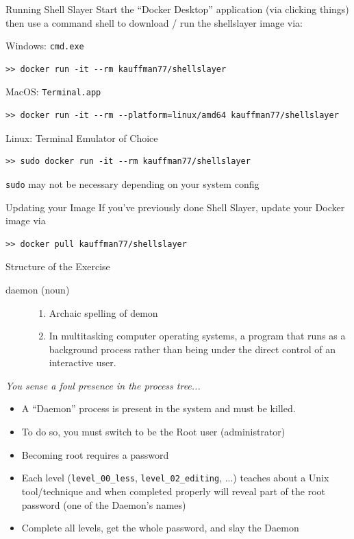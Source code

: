 \documentclass[mathserif]{beamer}
\begin{document}
\begin{frame}[label={sec:org00be9dd},fragile]{Running Shell Slayer}
 Start the ``Docker Desktop'' application (via clicking things) then use
a command shell to download / run the shellslayer image via:

\footnotesize
\begin{block}{Windows: \texttt{cmd.exe}}
\begin{verbatim}
>> docker run -it --rm kauffman77/shellslayer
\end{verbatim}
\end{block}
\begin{block}{MacOS: \texttt{Terminal.app}}
\begin{verbatim}
>> docker run -it --rm --platform=linux/amd64 kauffman77/shellslayer
\end{verbatim}
\end{block}
\begin{block}{Linux: Terminal Emulator of Choice}
\begin{verbatim}
>> sudo docker run -it --rm kauffman77/shellslayer
\end{verbatim}
\texttt{sudo} may not be necessary depending on your system config
\end{block}
\begin{block}{Updating your Image}
If you've previously done Shell Slayer, update your Docker image via
\begin{verbatim}
>> docker pull kauffman77/shellslayer
\end{verbatim}
\end{block}
\end{frame}
\begin{frame}[label={sec:orgffa0f62},fragile]{Structure of the Exercise}
 \begin{description}
\item[{daemon (noun)}] \begin{enumerate}
\item Archaic spelling of demon
\item In multitasking computer operating systems, a program that runs
as a background process rather than being under the direct
control of an interactive user.
\end{enumerate}
\end{description}

\normalsize
\emph{You sense a foul presence in the process tree...}
\begin{itemize}
\item A ``Daemon'' process is present in the system and must be killed.
\item To do so, you must switch to be the Root user (administrator)
\item Becoming root requires a password
\item Each level (\texttt{level\_00\_less}, \texttt{level\_02\_editing}, ...) teaches about
a Unix tool/technique and when completed properly will reveal part
of the root password (one of the Daemon's names)
\item Complete all levels, get the whole password, and slay the
Daemon
\end{itemize}
\end{frame}
\end{document}
